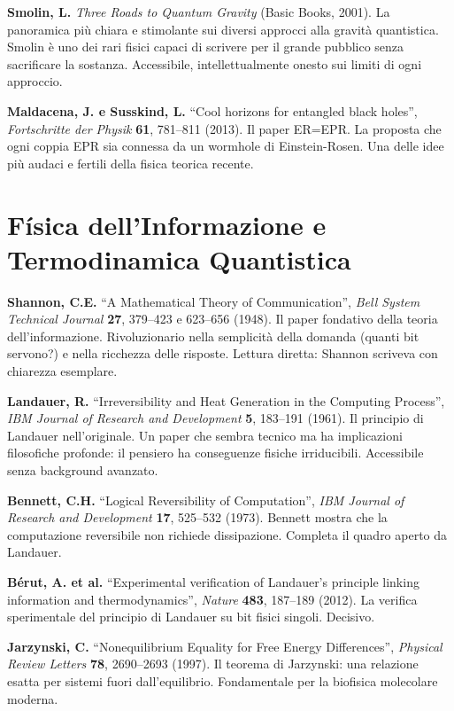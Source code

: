 \documentclass[11.5pt,a4paper,openany]{book}
\theoremstyle{remark}
\begin{document}
\textbf{Smolin, L.} \textit{Three Roads to Quantum Gravity} (Basic Books, 2001). La panoramica più chiara e stimolante sui diversi approcci alla gravità quantistica. Smolin è uno dei rari fisici capaci di scrivere per il grande pubblico senza sacrificare la sostanza. Accessibile, intellettualmente onesto sui limiti di ogni approccio.

\textbf{Maldacena, J. e Susskind, L.} ``Cool horizons for entangled black holes'', \textit{Fortschritte der Physik} \textbf{61}, 781--811 (2013). Il paper ER=EPR. La proposta che ogni coppia EPR sia connessa da un wormhole di Einstein-Rosen. Una delle idee più audaci e fertili della fisica teorica recente.

\section{Física dell'Informazione e Termodinamica Quantistica}

\textbf{Shannon, C.E.} ``A Mathematical Theory of Communication'', \textit{Bell System Technical Journal} \textbf{27}, 379--423 e 623--656 (1948). Il paper fondativo della teoria dell'informazione. Rivoluzionario nella semplicità della domanda (quanti bit servono?) e nella ricchezza delle risposte. Lettura diretta: Shannon scriveva con chiarezza esemplare.

\textbf{Landauer, R.} ``Irreversibility and Heat Generation in the Computing Process'', \textit{IBM Journal of Research and Development} \textbf{5}, 183--191 (1961). Il principio di Landauer nell'originale. Un paper che sembra tecnico ma ha implicazioni filosofiche profonde: il pensiero ha conseguenze fisiche irriducibili. Accessibile senza background avanzato.

\textbf{Bennett, C.H.} ``Logical Reversibility of Computation'', \textit{IBM Journal of Research and Development} \textbf{17}, 525--532 (1973). Bennett mostra che la computazione reversibile non richiede dissipazione. Completa il quadro aperto da Landauer.

\textbf{Bérut, A. et al.} ``Experimental verification of Landauer's principle linking information and thermodynamics'', \textit{Nature} \textbf{483}, 187--189 (2012). La verifica sperimentale del principio di Landauer su bit fisici singoli. Decisivo.

\textbf{Jarzynski, C.} ``Nonequilibrium Equality for Free Energy Differences'', \textit{Physical Review Letters} \textbf{78}, 2690--2693 (1997). Il teorema di Jarzynski: una relazione esatta per sistemi fuori dall'equilibrio. Fondamentale per la biofisica molecolare moderna.
\end{document}
